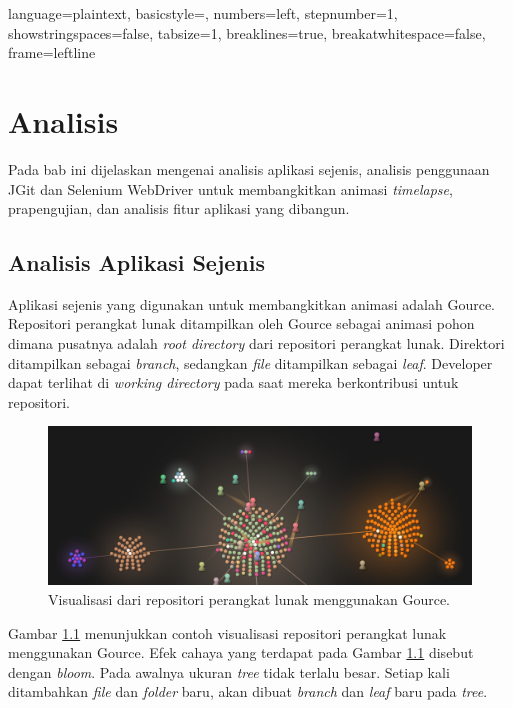 
\lstset
{ 
     language=plaintext,
     basicstyle=\footnotesize,
     numbers=left,
     stepnumber=1,
     showstringspaces=false,
     tabsize=1,
     breaklines=true,
     breakatwhitespace=false,
     frame=leftline
}

\chapter{Analisis}
\label{chap:analisis}
Pada bab ini dijelaskan mengenai analisis aplikasi sejenis, analisis penggunaan JGit dan Selenium WebDriver untuk membangkitkan animasi \textit{timelapse}, prapengujian, dan analisis fitur aplikasi yang dibangun. 

\section{Analisis Aplikasi Sejenis}
\label{sec:analisis_aplikasi_sejenis}
Aplikasi sejenis yang digunakan untuk membangkitkan animasi adalah Gource.  
Repositori perangkat lunak ditampilkan oleh Gource sebagai animasi pohon dimana pusatnya adalah \textit{root directory} dari repositori perangkat lunak\cite{Gource}. Direktori ditampilkan sebagai \textit{branch}, sedangkan \textit{file} ditampilkan sebagai \textit{leaf}. Developer dapat terlihat di \textit{working directory} pada saat mereka berkontribusi untuk repositori.

\begin{figure}[H]
	\centering
		\includegraphics[scale=0.2]{Gambar/gource.jpg}
	\caption{Visualisasi dari repositori perangkat lunak menggunakan Gource.}
	\label{fig:gource}
\end{figure}

Gambar \ref{fig:gource} menunjukkan contoh visualisasi repositori perangkat lunak menggunakan Gource. Efek cahaya yang terdapat pada Gambar \ref{fig:gource} disebut dengan \textit{bloom}. Pada awalnya ukuran \textit{tree} tidak terlalu besar. Setiap kali ditambahkan \textit{file} dan \textit{folder} baru, akan dibuat \textit{branch} dan \textit{leaf} baru pada \textit{tree}.  

